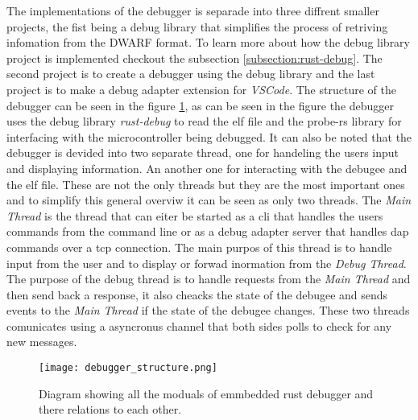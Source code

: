  

The implementations of the debugger is separade into three diffrent smaller projects, the fist being a debug library that simplifies the process of retriving infomation from the \gls{DWARF} format.
To learn more about how the debug library project is implemented checkout the subsection \ref{subsection:rust-debug}.
The second project is to create a debugger using the debug library and the last project is to make a debug adapter extension for \emph{VSCode}.
The structure of the debugger can be seen in the figure \ref{fig:EDBStruct}, as can be seen in the figure the debugger uses the debug library \emph{rust-debug} to read the \gls{elf} file and the probe-rs library for interfacing with the microcontroller being debugged.
It can also be noted that the debugger is devided into two separate thread, one for handeling the users input and displaying information.
An another one for interacting with the \gls{debugee} and the \gls{elf} file.
These are not the only threads but they are the most important ones and to simplify this general overviw it can be seen as only two threads.
The \emph{Main Thread} is the thread that can eiter be started as a cli that handles the users commands from the command line or as a debug adapter server that handles \acrshort{dap} commands over a \gls{tcp} connection.
The main purpos of this thread is to handle input from the user and to display or forwad inormation from the \emph{Debug Thread}.
The purpose of the debug thread is to handle requests from the \emph{Main Thread} and then send back a response, it also cheacks the state of the \gls{debugee} and sends events to the \emph{Main Thread} if the state of the debugee changes.
These two threads comunicates using a asyncronus channel that both sides polls to check for any new messages.


\begin{figure}[h]
	\centering
	\texttt{[image: debugger\_structure.png]}
	\caption{Diagram showing all the moduals of emmbedded rust debugger and there relations to each other.}
	\label{fig:EDBStruct}
\end{figure}


